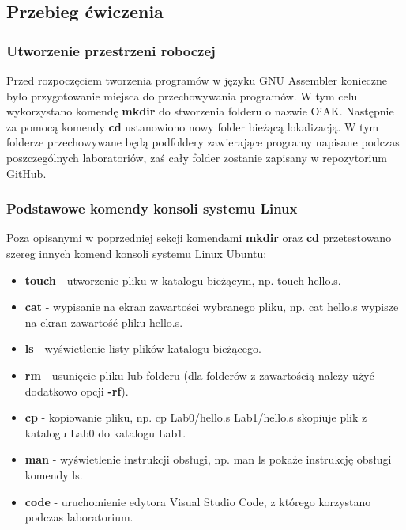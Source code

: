 \documentclass[a4paper,12pt]{article}
\begin{document}
\subsection{Przebieg ćwiczenia}
\subsubsection{Utworzenie przestrzeni roboczej}
Przed rozpoczęciem tworzenia programów w języku GNU Assembler konieczne było przygotowanie miejsca do przechowywania programów. W tym celu wykorzystano komendę \textbf{mkdir} do stworzenia folderu o nazwie OiAK. Następnie za pomocą komendy \textbf{cd} ustanowiono nowy folder bieżącą lokalizacją. W tym folderze przechowywane będą podfoldery zawierające programy napisane podczas poszczególnych laboratoriów, zaś cały folder zostanie zapisany w repozytorium GitHub.
\subsubsection{Podstawowe komendy konsoli systemu Linux}
Poza opisanymi w poprzedniej sekcji komendami \textbf{mkdir} oraz \textbf{cd} przetestowano szereg innych komend konsoli systemu Linux Ubuntu:
\begin{itemize}
	\item \textbf{touch} - utworzenie pliku w katalogu bieżącym, np. touch hello.s.
	\item \textbf{cat} - wypisanie na ekran zawartości wybranego pliku, np. cat hello.s wypisze na ekran zawartość pliku hello.s.
	\item \textbf{ls} - wyświetlenie listy plików katalogu bieżącego.
	\item \textbf{rm} - usunięcie pliku lub folderu (dla folderów z zawartością należy użyć dodatkowo opcji \textbf{-rf}).
	\item \textbf{cp} - kopiowanie pliku, np. cp Lab0/hello.s Lab1/hello.s skopiuje plik z katalogu Lab0 do katalogu Lab1.
	\item \textbf{man} - wyświetlenie instrukcji obsługi, np. man ls pokaże instrukcję obsługi komendy ls.
	\item \textbf{code} - uruchomienie edytora Visual Studio Code, z którego korzystano podczas laboratorium.
\end{itemize}
\end{document}

